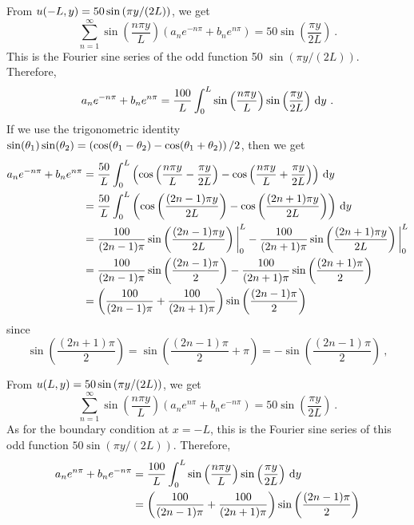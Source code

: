 \begin{egg}
From $\displaystyle u(-L,y) = 50 \sin\left(\pi y/(2L)\right)$, we get
\[
\sum_{n=1}^\infty \sin\left(\frac{n\pi y}{L}\right)
\left(a_n e^{-n\pi} + b_n e^{n\pi} \right) =
50 \sin\left(\frac{\pi y}{2L}\right) \ .
\]
This is the Fourier sine series of the odd function 50
$\sin\left(\pi y/(2L)\right)$.  Therefore,
\[
a_n e^{-n\pi} + b_n e^{n\pi} =
\frac{100}{L} \int_0^L \sin\left(\frac{n\pi y}{L}\right)
\sin\left(\frac{\pi y}{2L}\right) \,\mathrm{d}{y} \ .
\]
If we use the trigonometric identity
$\displaystyle \sin(\theta_1)\sin(\theta_2) = 
\left(\cos(\theta_1-\theta_2) -\cos(\theta_1+\theta_2)\right)/2$,
then we get
\begin{align}
a_n e^{-n\pi} + b_n e^{n\pi} &=
\frac{50}{L} \int_0^L \left( \cos\left(\frac{n\pi y}{L}-\frac{\pi y}{2L}\right)
- \cos\left(\frac{n\pi y}{L}+\frac{\pi y}{2L}\right)\right) \,\mathrm{d}{y}
\nonumber \\
&= \frac{50}{L} \int_0^L \left( \cos\left(\frac{(2n-1)\pi y}{2L}\right)
- \cos\left(\frac{(2n+1)\pi y}{2L}\right)\right) \,\mathrm{d}{y} \nonumber \\
&= \frac{100}{(2n-1)\pi} \sin\left(\frac{(2n-1)\pi y}{2L}\right)\bigg|_0^L
- \frac{100}{(2n+1)\pi} \sin\left(\frac{(2n+1)\pi y}{2L}\right)\bigg|_0^L
\nonumber \\
&= \frac{100}{(2n-1)\pi} \sin\left(\frac{(2n-1)\pi}{2}\right)
- \frac{100}{(2n+1)\pi} \sin\left(\frac{(2n+1)\pi}{2}\right) \nonumber \\
&= \left( \frac{100}{(2n-1)\pi} + \frac{100}{(2n+1)\pi}\right)
\sin\left(\frac{(2n-1)\pi}{2}\right)  \label{laplace_spv_egg2a}
\end{align}
since
\[
\sin\left(\frac{(2n+1)\pi}{2}\right) =
\sin\left(\frac{(2n-1)\pi}{2} + \pi\right)
= -\sin\left(\frac{(2n-1)\pi}{2}\right) \ ,
\]

From $\displaystyle u(L,y) = 50 \sin\left(\pi y/(2L)\right)$,
we get
\[
\sum_{n=1}^\infty \sin\left(\frac{n\pi y}{L}\right)
\left(a_n e^{n\pi} + b_n e^{-n\pi} \right) =
50 \sin\left(\frac{\pi y}{2L}\right) \ .
\]
As for the boundary condition at $x=-L$, this is the Fourier sine series of
this odd function $50 \sin\left(\pi y/(2L)\right)$.  Therefore,
\begin{align}
a_n e^{n\pi} + b_n e^{-n\pi} &=
\frac{100}{L} \int_0^L \sin\left(\frac{n\pi y}{L}\right)
\sin\left(\frac{\pi y}{2L}\right) \,\mathrm{d}{y} \nonumber \\
&= \left( \frac{100}{(2n-1)\pi} + \frac{100}{(2n+1)\pi}\right)
\sin\left(\frac{(2n-1)\pi}{2}\right) \label{laplace_spv_egg2b}
\end{align}


\end{egg}
